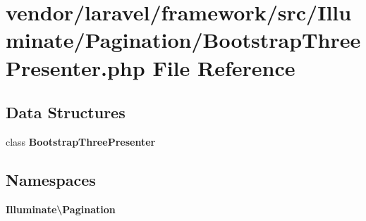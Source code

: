 \section{vendor/laravel/framework/src/\+Illuminate/\+Pagination/\+Bootstrap\+Three\+Presenter.php File Reference}
\label{_bootstrap_three_presenter_8php}
\subsection*{Data Structures}
\begin{DoxyCompactItemize}
\item 
class {\bf Bootstrap\+Three\+Presenter}
\end{DoxyCompactItemize}
\subsection*{Namespaces}
\begin{DoxyCompactItemize}
\item 
 {\bf Illuminate\textbackslash{}\+Pagination}
\end{DoxyCompactItemize}
